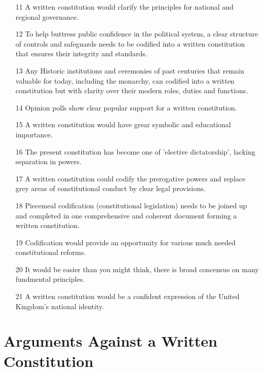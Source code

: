 \documentclass[14pt,titlepage]{extarticle}
\begin{document}
\begin{itemize}
\item[11]
  A written constitution would clarify the principles for national and regional governance.

\item[12]
  To help buttress public confidence in
the political system, a clear structure of controls and safeguards needs to be
codified into a written constitution that ensures their integrity and standards.

\item[13]
  Any
Historic institutions and ceremonies of past centuries that remain valuable for
today, including the monarchy, can codified into a written constitution
but with clarity over their modern roles, duties and functions.

\item[14]
 Opinion polls show clear popular support for a written constitution. 

\item[15]
 A written constitution would have grear symbolic and educational importance.

\item[16]
 The present constitution has become one of 'elective dictatorship', lacking separation in powers.

\item[17]
  A written constitution could codify the prerogative powers and replace grey areas of constitutional conduct by clear legal provisions.

\item[18]
 Piecemeal codification (constitutional legislation) needs to be joined up and completed in one comprehensive and coherent document forming a written constitution.

\item[19]
  Codification would provide an opportunity for various much needed constitutional reforms.


\item[20]
 It would be easier than you might think, there is broad concensus on many fundmental principles.

\item[21]
  A written constitution would be a confident expression of the United
Kingdom's national identity.

\end{itemize}

\section{Arguments Against a Written Constitution}\label{Against}
\end{document}
